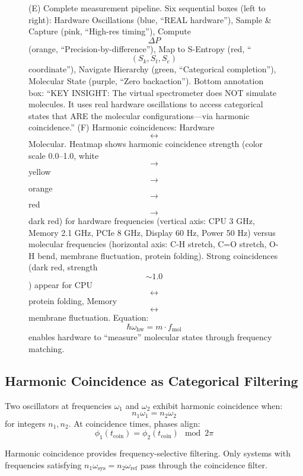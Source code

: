 \begin{figure}[htbp]
{    (E) Complete measurement pipeline. Six sequential boxes (left to right): Hardware Oscillations (blue, ``REAL hardware''), Sample \& Capture (pink, ``High-res timing''), Compute $$\Delta P$$ (orange, ``Precision-by-difference''), Map to S-Entropy (red, ``$$(S_k, S_t, S_e)$$ coordinate''), Navigate Hierarchy (green, ``Categorical completion''), Molecular State (purple, ``Zero backaction''). Bottom annotation box: ``KEY INSIGHT: The virtual spectrometer does NOT simulate molecules. It uses real hardware oscillations to access categorical states that ARE the molecular configurations—via harmonic coincidence.'' 
    (F) Harmonic coincidences: Hardware $$\leftrightarrow$$ Molecular. Heatmap shows harmonic coincidence strength (color scale 0.0--1.0, white $$\to$$ yellow $$\to$$ orange $$\to$$ red $$\to$$ dark red) for hardware frequencies (vertical axis: CPU 3 GHz, Memory 2.1 GHz, PCIe 8 GHz, Display 60 Hz, Power 50 Hz) versus molecular frequencies (horizontal axis: C-H stretch, C=O stretch, O-H bend, membrane fluctuation, protein folding). Strong coincidences (dark red, strength $$\sim 1.0$$) appear for CPU $$\leftrightarrow$$ protein folding, Memory $$\leftrightarrow$$ membrane fluctuation. Equation: $$\hbar\omega_{\text{hw}} = m \cdot f_{\text{mol}}$$ enables hardware to ``measure'' molecular states through frequency matching.}
    \label{fig:hardware_virtual_spectrometer}
    \end{figure}

\subsection{Harmonic Coincidence as Categorical Filtering}

\begin{definition}
\label{def:harmonic_coincidence}
Two oscillators at frequencies $\omega_1$ and $\omega_2$ exhibit harmonic coincidence when:
\begin{equation}
n_1 \omega_1 = n_2 \omega_2
\end{equation}
for integers $n_1, n_2$. At coincidence times, phases align:
\begin{equation}
\phi_1(t_{\text{coin}}) = \phi_2(t_{\text{coin}}) \mod 2\pi
\end{equation}
\end{definition}

\begin{proposition}
\label{prop:coincidence_filtering}
Harmonic coincidence provides frequency-selective filtering. Only systems with frequencies satisfying $n_1\omega_{\text{sys}} = n_2\omega_{\text{ref}}$ pass through the coincidence filter.
\end{proposition}

